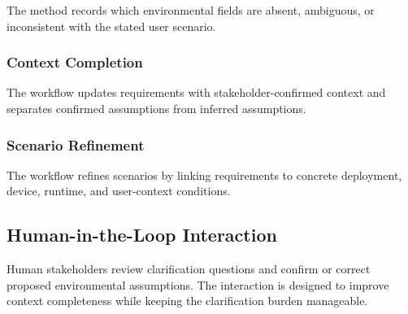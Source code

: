 The method records which environmental fields are absent, ambiguous, or inconsistent with the stated user scenario.

\subsubsection{Context Completion}
\label{method:context_completion}

The workflow updates requirements with stakeholder-confirmed context and separates confirmed assumptions from inferred assumptions.

\subsubsection{Scenario Refinement}
\label{method:scenario_refinement}

The workflow refines scenarios by linking requirements to concrete deployment, device, runtime, and user-context conditions.

\subsection{Human-in-the-Loop Interaction}
\label{method:hitl}

Human stakeholders review clarification questions and confirm or correct proposed environmental assumptions.
The interaction is designed to improve context completeness while keeping the clarification burden manageable.
